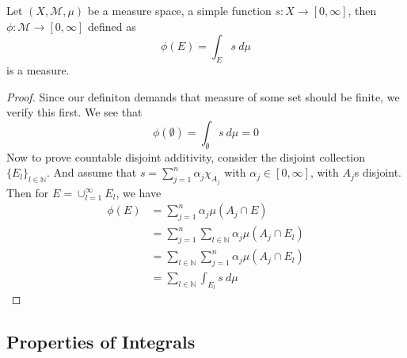 
\chapter{}

\begin{remark}
  \label{remark:measure_from_integral}
  Let $(X, \mathcal{M}, \mu)$ be a measure space, a simple function $s: X \to [0, \infty]$, then $\phi: \mathcal{M} \to [0, \infty]$ defined as \[
    \phi(E) = \int_E s \ d \mu
  \]
  is a measure.
\end{remark}
\begin{proof}
  Since our definiton demands that measure of some set should be finite, we verify this first. We see that \[
    \phi(\emptyset) = \int_\emptyset s \ d \mu = 0
  \]
  Now to prove countable disjoint additivity, consider the disjoint collection $\{ E_l \}_{l \in \mathbb{N}}$. And assume that $s = \sum_{j = 1}^{n} \alpha_j \chi_{A_j}$ with $ \alpha_j \in [0, \infty]$, with $A_j$s disjoint. Then for $E = \cup_{l = 1}^{\infty}E_l$, we have \begin{align*}
    \phi(E) &= \sum_{j = 1}^{n} \alpha_j \mu(A_j \cap E) \\ 
    &= \sum_{ j = 1}^{n} \sum_{l \in \mathbb{N}} \alpha_j \mu(A_j \cap E_l) \\ 
    &= \sum_{ l \in \mathbb{N}} \sum_{j = 1}^{n} \alpha_j \mu(A_j \cap E_l) \\ 
    &= \sum_{ l \in \mathbb{N}} \int_{E_l} s \ d \mu
  \end{align*}
\end{proof}


\section{Properties of Integrals}

